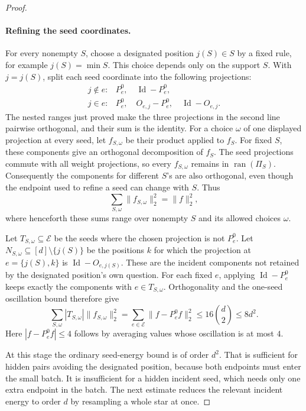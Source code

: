 \begin{proof}
\paragraph{Refining the seed coordinates.}
For every nonempty \(S\), choose a designated position \(j(S)\in S\)
by a fixed rule, for example \(j(S)=\min S\).  This choice depends only
on the support \(S\).  With \(j=j(S)\), split each seed coordinate into
the following projections:
\[
 \begin{array}{ll}
 j\notin e:
   &P_e^0,\quad\operatorname{Id}-P_e^0,\\[3pt]
 j\in e:
   &P_e^0,\quad O_{e,j}-P_e^0,\quad\operatorname{Id}-O_{e,j}.
 \end{array}
\]
The nested ranges just proved make the three projections in the second
line pairwise orthogonal, and their sum is the identity.  For a choice
\(\omega\) of one displayed projection at every seed, let
\(f_{S,\omega}\) be their product applied to \(f_S\).  For fixed
\(S\), these components give an orthogonal decomposition of \(f_S\).
The seed projections commute with all weight projections, so every
\(f_{S,\omega}\) remains in \(\operatorname{ran}(\Pi_S)\).
Consequently the components for different \(S\)'s are also orthogonal,
even though the endpoint used to refine a seed can change with \(S\).
Thus
\begin{equation}\label{res:component-energy}
 \sum_{S,\omega}\|f_{S,\omega}\|_2^2=\|f\|_2^2,
\end{equation}
where henceforth these sums range over nonempty \(S\) and its allowed
choices \(\omega\).

Let \(T_{S,\omega}\subseteq\mathcal E\) be the seeds where the chosen
projection is not \(P_e^0\).  Let
\(N_{S,\omega}\subseteq[d]\setminus\{j(S)\}\) be the positions
\(k\) for which the projection at \(e=\{j(S),k\}\) is
\(\operatorname{Id}-O_{e,j(S)}\).  These are the incident components
not retained by the designated position's own question.
For each fixed \(e\), applying \(\operatorname{Id}-P_e^0\) keeps
exactly the components with \(e\in T_{S,\omega}\).  Orthogonality and
the one-seed oscillation bound therefore give
\begin{equation}\label{res:seed-degree}
 \sum_{S,\omega}|T_{S,\omega}|\|f_{S,\omega}\|_2^2
  =\sum_{e\in\mathcal E}\|f-P_e^0f\|_2^2
  \leq16\binom d2\leq8d^2.
\end{equation}
Here \(|f-P_e^0f|\leq4\) follows by averaging values whose oscillation
is at most \(4\).

At this stage the ordinary seed-energy bound is of order \(d^2\).
That is sufficient for hidden pairs avoiding the designated position,
because both endpoints must enter the small batch. It is insufficient
for a hidden incident seed, which needs only one extra endpoint in the
batch. The next estimate reduces the relevant incident energy to order
\(d\) by resampling a whole star at once.


\end{proof}
